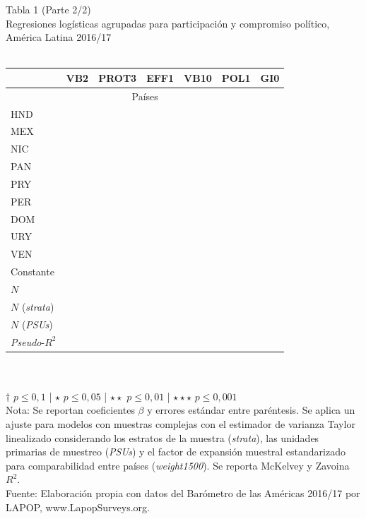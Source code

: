 \documentclass[a4paper]{tufte-handout}
\begin{document}
\begin{table}[h]
  \centering
  \selectfont
   \smallskip\noindent\small Tabla 1 (Parte 2/2) \\ Regresiones logísticas agrupadas para participación y compromiso político, América Latina 2016/17 \\~\\
  \begin{tabular}{l c c c c c c}
    \toprule
     & VB2 & PROT3 & EFF1 & VB10 & POL1 & GI0 \\ \midrule
    \multicolumn{7}{c}{Países} \\ \midrule
    \multirow{2}{*}{HND} & & & & & & \\
    & & & & & & \\
    \multirow{2}{*}{MEX} & & & & & & \\
    & & & & & & \\
    \multirow{2}{*}{NIC} & & & & & & \\
    & & & & & & \\
    \multirow{2}{*}{PAN} & & & & & & \\
    & & & & & & \\
    \multirow{2}{*}{PRY} & & & & & & \\
    & & & & & & \\
    \multirow{2}{*}{PER} & & & & & & \\
    & & & & & & \\ 
    \multirow{2}{*}{DOM} & & & & & & \\
    & & & & & & \\ 
    \multirow{2}{*}{URY} & & & & & & \\
    & & & & & & \\
    \multirow{2}{*}{VEN} & & & & & & \\
    & & & & & & \\ \midrule
    \multirow{2}{*}{Constante} & & & & & & \\
    & & & & & & \\ \midrule
    $N$ & & & & & & \\
    $N$ ({\itshape strata}) & & & & & & \\
    $N$ ({\itshape PSUs}) & & & & & & \\ \midrule
    {\itshape Pseudo}-$R^2$ & & & & & & \\ \bottomrule
  \end{tabular}
  \\~\\ \smallskip\noindent\scriptsize $\dagger$ $p \leq 0,1$ | $\star$ $p \leq 0,05$ | $\star\star$ $p \leq 0,01$ | $\star\star\star$ $p \leq 0,001$  \\ Nota: Se reportan coeficientes $\beta$ y errores estándar entre paréntesis. Se aplica un ajuste para modelos con muestras complejas con el estimador de varianza Taylor linealizado considerando los estratos de la muestra ({\itshape strata}), las unidades primarias de muestreo ({\itshape PSUs}) y el factor de expansión muestral estandarizado para comparabilidad entre países ({\itshape weight1500}). Se reporta McKelvey y Zavoina $R^2$. \\ Fuente: Elaboración propia con datos del Barómetro de las Américas 2016/17 por LAPOP, www.LapopSurveys.org. 

\end{table}
\end{document}
